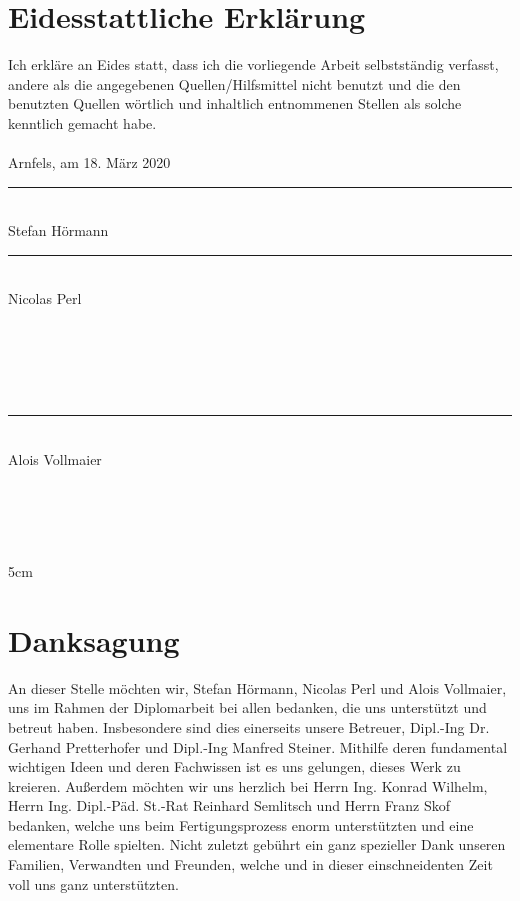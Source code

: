 \frontmatter												%
\addtocounter{page}{2}

\newcommand{\doublesignature}[2]{%
  \parbox{\textwidth}{
    \hfill
    \parbox{7cm}{
      \centering
      \rule{6cm}{1pt}\\
      #1
    }
    \parbox{7cm}{
      \centering
      \rule{6cm}{1pt}\\
      #2
    }
  }
  \mbox{}\\
  \mbox{}\\
  \mbox{}\\
  \mbox{}\\
}
\newcommand{\singlesignature}[2]{%
  \parbox{\textwidth}{
    \hfill
    \parbox{7cm}{
      \centering
      \rule{6cm}{1pt}\\
      #1
    }
  }
  \mbox{}\\
  \mbox{}\\
  \mbox{}\\
  \mbox{}\\
}

\vspace*{20pt}

\section*{Eidesstattliche Erklärung}
\label{sec:eidesstattliche-erklaerung}
Ich erkläre an Eides statt, dass ich die vorliegende Arbeit selbstständig verfasst, andere als die angegebenen
Quellen/Hilfsmittel nicht benutzt und die den benutzten Quellen wörtlich und inhaltlich entnommenen
Stellen als solche kenntlich gemacht habe.\\
\\
Arnfels, am 18. März 2020\\

\vskip 1cm

\doublesignature{Stefan Hörmann}{Nicolas Perl}
\singlesignature{Alois Vollmaier}

\vskip 5cm

\clearpage

\newpage
\thispagestyle{empty}
\mbox{}

\clearpage

\section*{Danksagung}
\label{sec:danksagung}
An dieser Stelle möchten wir, Stefan Hörmann, Nicolas Perl und Alois Vollmaier, uns im Rahmen der Diplomarbeit bei allen bedanken, die uns unterstützt und betreut haben.
Insbesondere sind dies einerseits unsere Betreuer, Dipl.-Ing Dr. Gerhand Pretterhofer und Dipl.-Ing Manfred Steiner.
Mithilfe deren fundamental wichtigen Ideen und deren Fachwissen ist es uns gelungen, dieses Werk zu kreieren.
Außerdem möchten wir uns herzlich bei Herrn Ing. Konrad Wilhelm, Herrn Ing. Dipl.-Päd. St.-Rat Reinhard Semlitsch und Herrn Franz Skof bedanken, welche uns beim Fertigungsprozess enorm unterstützten und eine elementare Rolle spielten.
Nicht zuletzt gebührt ein ganz spezieller Dank unseren Familien, Verwandten und Freunden, welche und in dieser einschneidenten Zeit voll uns ganz unterstützten.
\clearpage

